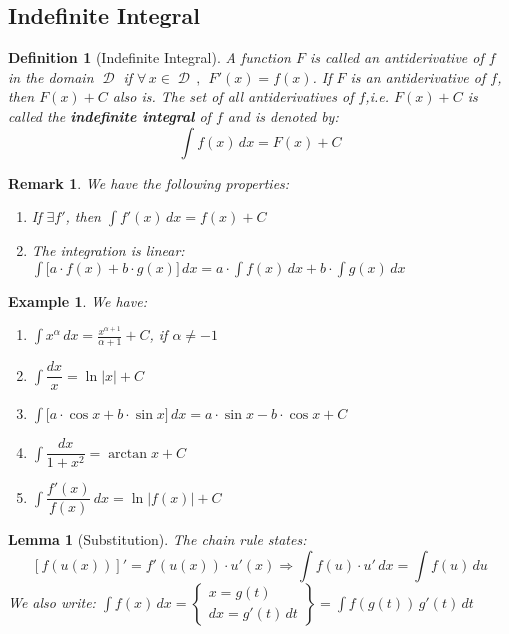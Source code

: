 \documentclass[12pt]{article}
\let\RA\Rightarrow
\newcommand{\Forall}[1]{\forall\,{#1}\,,\,}
\DeclareMathOperator{\D}{\mathcal{D}}
\newtheorem{definition}{Definition}[subsection]
\newtheorem{lemma}{Lemma}[subsection]
\newtheorem{example}{Example}[subsection]
\newtheorem{remark}{Remark}[subsection]
\begin{document}
\subsection{Indefinite Integral}

\begin{definition}[Indefinite Integral]
  A function $F$ is called an antiderivative of $f$ in the domain $\D$ if $\Forall{x\in\D}\;F'(x)=f(x)$. If $F$ is an antiderivative of $f$, then $F(x)+C$ also is. The set of all antiderivatives of $f$,i.e. $F(x)+C$ is called the \textbf{indefinite integral} of $f$ and is denoted by: $$\int f(x)\,dx=F(x)+C$$
\end{definition}

\begin{remark}
  We have the following properties:
  \begin{enumerate}
    \item If $\exists f'$, then $\displaystyle\int f'(x)\,dx=f(x)+C$
    \item The integration is linear: $\displaystyle\int \Big[a\cdot f(x)+b\cdot g(x)\Big]\,dx=a\cdot\int f(x)\,dx+b\cdot\int g(x)\,dx$
  \end{enumerate}
\end{remark}

\begin{example}
  We have:
  \begin{enumerate}
    \item $\displaystyle\int x^\alpha\,dx=\frac{x^{\alpha+1}}{\alpha+1}+C$, if $\alpha\neq -1$
    \item $\displaystyle\int\dfrac{dx}{x}=\ln|x|+C$
    \item $\displaystyle\int \Big[a\cdot \cos{x}+b\cdot \sin{x}\Big]\,dx=a\cdot\sin{x}-b\cdot\cos{x}+C$
    \item $\displaystyle\int\dfrac{dx}{1+x^2}=\arctan{x}+C$
    \item $\displaystyle\int\dfrac{f'(x)}{f(x)}\,dx=\ln|f(x)|+C$
  \end{enumerate}
\end{example}

\begin{lemma}[Substitution]
  The chain rule states:$$[f(u(x))]'=f'(u(x))\cdot u'(x) \RA \displaystyle\int f(u)\cdot u'\,dx=\int f(u)\,du$$
  We also write: $\displaystyle\int f(x)\,dx=\left\{\begin{array}{lr}x=g(t)\\dx=g'(t)\,dt\end{array}\right\}=\int f(g(t))\,g'(t)\,dt$
\end{lemma}
\end{document}
